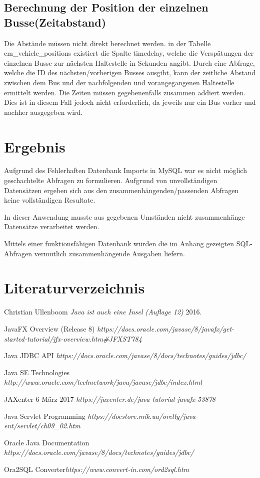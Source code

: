 \documentclass[a4paper, 12.5pt]{scrartcl}
\begin{document}
\subsection{Berechnung der Position der einzelnen Busse(Zeitabstand)}
Die Abstände müssen nicht direkt berechnet werden. in der Tabelle cm\_vehicle\_positions existiert die Spalte timedelay, welche die Verspätungen der einzelnen Busse zur nächsten Haltestelle in Sekunden angibt. Durch eine Abfrage, welche die ID des nächsten/vorherigen Busses ausgibt, kann der zeitliche Abstand zwischen dem Bus und der nachfolgenden und vorangegangenen Haltestelle ermittelt werden. Die Zeiten müssen gegebenenfalls zusammen addiert werden. Dies ist in diesem Fall jedoch nicht erforderlich, da jeweils nur ein Bus vorher und nachher ausgegeben wird.

\section{Ergebnis}
Aufgrund des Fehlerhaften Datenbank Imports in MySQL war es 
nicht möglich geschachtelte Abfragen zu formulieren. Aufgrund von unvollständigen Datensätzen ergeben sich aus den zusammenhängenden/passenden Abfragen keine vollständigen Resultate.

In dieser Anwendung musste aus gegebenen Umständen nicht zusammenhänge Datensätze verarbeitet werden.

Mittels einer funktionsfähigen Datenbank würden die im Anhang gezeigten SQL-Abfragen vermutlich zusammenhängende Ausgaben liefern.
\newpage

\section{Literaturverzeichnis}
\begin{thebibliography}{1}

   Christian Ullenboom {\em Java ist auch eine Insel (Auflage 12)} 2016.

JavaFX Overview (Release 8) {\em https://docs.oracle.com/javase/8/javafx/get-started-tutorial/jfx-overview.htm\#JFXST784}

Java JDBC API {\em https://docs.oracle.com/javase/8/docs/technotes/guides/jdbc/}

Java SE Technologies {\em http://www.oracle.com/technetwork/java/javase/jdbc/index.html}

JAXenter 6 März 2017 {\em https://jaxenter.de/java-tutorial-javafx-53878}

Java Servlet Programming {\em https://docstore.mik.ua/orelly/java-ent/servlet/ch09\_02.htm}

Oracle Java Documentation {\em https://docs.oracle.com/javase/8/docs/technotes/guides/jdbc/}

Ora2SQL Converter{\em https://www.convert-in.com/ord2sql.htm}

\end{thebibliography}
\end{document}
